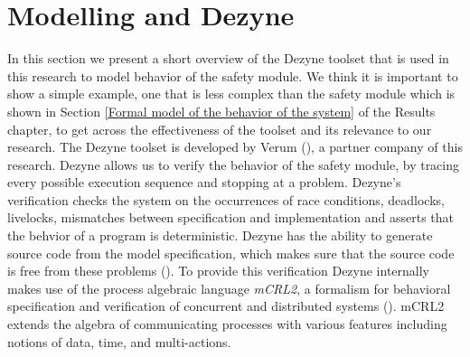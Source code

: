 \documentclass[12pt]{scrreprt}
\begin{document}
\section{Modelling and Dezyne}
\label{Modelling and Dezyne}
In this section we present a short overview of the Dezyne toolset that is used in this research to model behavior of the safety module. We think it is important to show a simple example, one that is less complex than the safety module which is shown in Section \ref{Formal model of the behavior of the system} of the Results chapter, to get across the effectiveness of the toolset and its relevance to our research. The Dezyne toolset is developed by Verum (\cite{verum}), a partner company of this research. Dezyne allows us to verify the behavior of the safety module, by tracing every possible execution sequence and stopping at a problem. Dezyne's verification checks the system on the occurrences of race conditions, deadlocks, livelocks, mismatches between specification and implementation and asserts that the behvior of a program is deterministic. Dezyne has the ability to generate source code from the model specification, which makes sure that the source code is free from these problems (\cite{dzntut}).
To provide this verification Dezyne internally makes use of the process algebraic language \textit{mCRL2}, a formalism for behavioral specification and verification of concurrent and distributed systems (\cite{mcrl2}). mCRL2 extends the algebra of communicating processes with various features including notions of data, time, and multi-actions.
\end{document}
